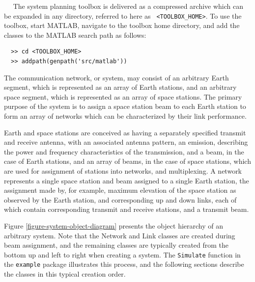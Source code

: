 \documentclass[11pt]{article}
\begin{document}
 
The system planning toolbox is delivered as a compressed archive which
can be expanded in any directory, referred to here as \texttt{\small
  <TOOLBOX\_HOME>}. To use the toolbox, start MATLAB, navigate to the
toolbox home directory, and add the classes to the MATLAB search path
as follows:
{\small
\begin{verbatim}
  >> cd <TOOLBOX_HOME>
  >> addpath(genpath('src/matlab'))
\end{verbatim}
}

The communication network, or system, may consist of an arbitrary
Earth segment, which is represented as an array of Earth stations, and
an arbitrary space segment, which is represented as an array of space
stations. The primary purpose of the system is to assign a space
station beam to each Earth station to form an array of networks which
can be characterized by their link performance.

Earth and space stations are conceived as having a separately
specified transmit and receive antenna, with an associated antenna
pattern, an emission, describing the power and frequency
characteristics of the transmission, and a beam, in the case of Earth
stations, and an array of beams, in the case of space stations, which
are used for assignment of stations into networks, and multiplexing. A
network represents a single space station and beam assigned to a
single Earth station, the assignment made by, for example, maximum
elevation of the space station as observed by the Earth station, and
corresponding up and down links, each of which contain corresponding
transmit and receive stations, and a transmit beam.

Figure \ref{figure-system-object-diagram} presents the object
hierarchy of an arbitrary system. Note that the Network and Link
classes are created during beam assignment, and the remaining classes
are typically created from the bottom up and left to right when
creating a system. The \texttt{\small Simulate} function in the
\texttt{\small example} package illustrates this process, and the
following sections describe the classes in this typical creation
order.
\end{document}
